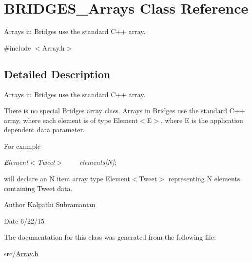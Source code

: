 \hypertarget{class_b_r_i_d_g_e_s___arrays}{}\section{B\+R\+I\+D\+G\+E\+S\+\_\+\+Arrays Class Reference}
\label{class_b_r_i_d_g_e_s___arrays}


Arrays in Bridges use the standard C++ array.  




{\ttfamily \#include $<$Array.\+h$>$}



\subsection{Detailed Description}
Arrays in Bridges use the standard C++ array. 

There is no special Bridges array class. Arrays in Bridges use the standard C++ array, where each element is of type Element$<$\+E$>$, where E is the application dependent data parameter.

For example

{\itshape Element$<$\+Tweet$>$ ~~~ elements\mbox{[}N\mbox{]}};

will declare an N item array type Element$<$\+Tweet$>$ representing N elements containing Tweet data.

\begin{DoxyAuthor}{Author}
Kalpathi Subramanian
\end{DoxyAuthor}
\begin{DoxyDate}{Date}
6/22/15 
\end{DoxyDate}


The documentation for this class was generated from the following file\+:\begin{DoxyCompactItemize}
\item 
src/\hyperlink{_array_8h}{Array.\+h}\end{DoxyCompactItemize}
